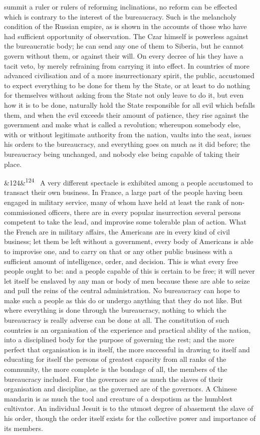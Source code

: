 \documentclass[12pt]{article}
\newcommand{\para}[1][]{\par\noindent\ifx&#1&\else\textsuperscript{\footnotesize #1}~\fi}
\begin{document}
summit a ruler or rulers of reforming inclinations, no reform can be effected which is contrary to the interest of the bureaucracy. Such is the melancholy condition of the Russian empire, as is shown in the accounts of those who have had sufficient opportunity of observation. The Czar himself is powerless against the bureaucratic body; he can send any one of them to Siberia, but he cannot govern without them, or against their will. On every decree of his they have a tacit veto, by merely refraining from carrying it into effect. In countries of more advanced civilisation and of a more insurrectionary spirit, the public, accustomed to expect everything to be done for them by the State, or at least to do nothing for themselves without asking from the State not only leave to do it, but even how it is to be done, naturally hold the State responsible for all evil which befalls them, and when the evil exceeds their amount of patience, they rise against the government and make what is called a revolution; whereupon somebody else, with or without legitimate authority from the nation, vaults into the seat, issues his orders to the bureaucracy, and everything goes on much as it did before; the bureaucracy being unchanged, and nobody else being capable of taking their place.

\para[124] A very different spectacle is exhibited among a people accustomed to transact their own business. In France, a large part of the people having been engaged in military service, many of whom have held at least the rank of non-commissioned officers, there are in every popular insurrection several persons competent to take the lead, and improvise some tolerable plan of action. What the French are in military affairs, the Americans are in every kind of civil business; let them be left without a government, every body of Americans is able to improvise one, and to carry on that or any other public business with a sufficient amount of intelligence, order, and decision. This is what every free people ought to be: and a people capable of this is certain to be free; it will never let itself be enslaved by any man or body of men because these are able to seize and pull the reins of the central administration. No bureaucracy can hope to make such a people as this do or undergo anything that they do not like. But where everything is done through the bureaucracy, nothing to which the bureaucracy is really adverse can be done at all. The constitution of such countries is an organisation of the experience and practical ability of the nation, into a disciplined body for the purpose of governing the rest; and the more perfect that organisation is in itself, the more successful in drawing to itself and educating for itself the persons of greatest capacity from all ranks of the community, the more complete is the bondage of all, the members of the bureaucracy included. For the governors are as much the slaves of their organisation and discipline, as the governed are of the governors. A Chinese mandarin is as much the tool and creature of a despotism as the humblest cultivator. An individual Jesuit is to the utmost degree of abasement the slave of his order, though the order itself exists for the collective power and importance of its members.
\end{document}
